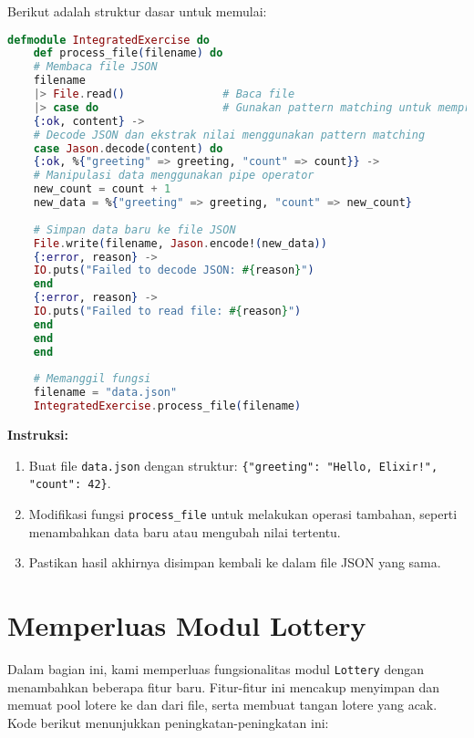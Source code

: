 Berikut adalah struktur dasar untuk memulai:

\begin{lstlisting}[language=Elixir]
	defmodule IntegratedExercise do
	def process_file(filename) do
	# Membaca file JSON
	filename
	|> File.read()               # Baca file
	|> case do                   # Gunakan pattern matching untuk memproses konten
	{:ok, content} ->
	# Decode JSON dan ekstrak nilai menggunakan pattern matching
	case Jason.decode(content) do
	{:ok, %{"greeting" => greeting, "count" => count}} ->
	# Manipulasi data menggunakan pipe operator
	new_count = count + 1
	new_data = %{"greeting" => greeting, "count" => new_count}
	
	# Simpan data baru ke file JSON
	File.write(filename, Jason.encode!(new_data))
	{:error, reason} ->
	IO.puts("Failed to decode JSON: #{reason}")
	end
	{:error, reason} ->
	IO.puts("Failed to read file: #{reason}")
	end
	end
	end
	
	# Memanggil fungsi
	filename = "data.json"
	IntegratedExercise.process_file(filename)
\end{lstlisting}

\textbf{Instruksi:}
\begin{enumerate}
	\item Buat file \texttt{data.json} dengan struktur: \texttt{\{"greeting": "Hello, Elixir!", "count": 42\}}.
	\item Modifikasi fungsi \texttt{process\_file} untuk melakukan operasi tambahan, seperti menambahkan data baru atau mengubah nilai tertentu.
	\item Pastikan hasil akhirnya disimpan kembali ke dalam file JSON yang sama.
\end{enumerate}

\section{Memperluas Modul Lottery}

Dalam bagian ini, kami memperluas fungsionalitas modul \texttt{Lottery} dengan menambahkan beberapa fitur baru. Fitur-fitur ini mencakup menyimpan dan memuat pool lotere ke dan dari file, serta membuat tangan lotere yang acak. Kode berikut menunjukkan peningkatan-peningkatan ini:


